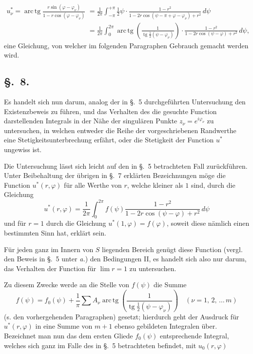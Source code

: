 \documentclass{article}
\begin{document}
\[
\begin{aligned}
u_\nu^* = \operatorname{arc\,tg}\frac{r\sin(\varphi - \varphi_\nu)}{1 - r\cos(\varphi - \varphi_\nu)} &= \frac{1}{2\pi} \int_{-\pi}^{+\pi} \frac{1}{2}\psi \cdot \frac{1 - r^2}{1 - 2r\cos(\psi - \pi + \varphi - \varphi_\nu) + r^2}\,d\psi \\
&= \frac{1}{2\pi} \int_0^{2\pi} \operatorname{arc\,tg}\left(\frac{1}{\operatorname{tg}\frac{1}{2}(\psi - \varphi_\nu)}\right) \cdot \frac{1 - r^2}{1 - 2r\cos(\psi - \varphi) + r^2}\,d\psi,
\end{aligned}
\]
eine Gleichung, von welcher im folgenden Paragraphen Gebrauch gemacht werden wird.

\subsection*{§.~8.}

Es handelt sich nun darum, analog der in §.~5 durchgeführten Untersuchung den Existenzbeweis zu führen, und das Verhalten des die gesuchte Function darstellenden Integrals in der Nähe der singulären Punkte $z_\nu = e^{i\varphi_\nu}$ zu untersuchen, in welchen entweder die Reihe der vorgeschriebenen Randwerthe eine Stetigkeitsunterbrechung erfährt, oder die Stetigkeit der Function $u^*$ ungewiss ist.

Die Untersuchung lässt sich leicht auf den in §.~5 betrachteten Fall zurückführen. Unter Beibehaltung der übrigen in §.~7 erklärten Bezeichnungen möge die Function $u^*(r, \varphi)$ für alle Werthe von $r$, welche kleiner als $1$ sind, durch die Gleichung
\[
u^*(r, \varphi) = \frac{1}{2\pi} \int_0^{2\pi} f(\psi) \frac{1 - r^2}{1 - 2r \cos(\psi - \varphi) + r^2}\,d\psi
\]
und für $r = 1$ durch die Gleichung $u^*(1, \varphi) = f(\varphi)$, soweit diese nämlich einen bestimmten Sinn hat, erklärt sein.

Für jeden ganz im Innern von $S$ liegenden Bereich genügt diese Function (vergl. den Beweis in §.~5 unter \emph{a.}) den Bedingungen II, es handelt sich also nur darum, das Verhalten der Function für $\lim r = 1$ zu untersuchen.

Zu diesem Zwecke werde an die Stelle von $f(\psi)$ die Summe
\[
f(\psi) = f_0(\psi) + \frac{1}{\pi} \sum A_\nu \operatorname{arc\,tg}\left(\frac{1}{\operatorname{tg}\frac{1}{2}(\psi - \varphi_\nu)}\right) \quad (\nu = 1, \, 2, \, \dots \, m)
\]
(s. den vorhergehenden Paragraphen) gesetzt; hierdurch geht der Ausdruck für $u^*(r, \varphi)$ in eine Summe von $m + 1$ ebenso gebildeten Integralen über. Bezeichnet man nun das dem ersten Gliede $f_0(\psi)$ entsprechende Integral, welches sich ganz im Falle des in §.~5 betrachteten befindet, mit $u_0(r, \varphi)$
\end{document}
